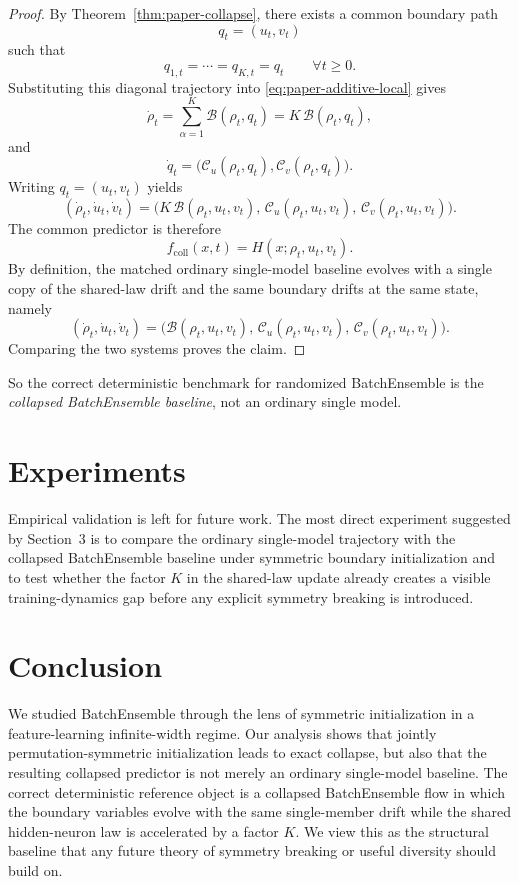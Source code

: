\documentclass{article}
\begin{document}
\begin{proof}
By Theorem~\ref{thm:paper-collapse}, there exists a common boundary path
\[
q_t=(u_t,v_t)
\]
such that
\[
q_{1,t}=\cdots=q_{K,t}=q_t
\qquad
\forall t\ge 0.
\]
Substituting this diagonal trajectory into \eqref{eq:paper-additive-local} gives
\[
\dot\rho_t
=
\sum_{\alpha=1}^K \mathcal B(\rho_t,q_t)
=
K\,\mathcal B(\rho_t,q_t),
\]
and
\[
\dot q_t
=
\bigl(\mathcal C_u(\rho_t,q_t),\mathcal C_v(\rho_t,q_t)\bigr).
\]
Writing $q_t=(u_t,v_t)$ yields
\[
(\dot\rho_t,\dot u_t,\dot v_t)
=
\bigl(
K\,\mathcal B(\rho_t,u_t,v_t),\,
\mathcal C_u(\rho_t,u_t,v_t),\,
\mathcal C_v(\rho_t,u_t,v_t)
\bigr).
\]
The common predictor is therefore
\[
f_{\mathrm{coll}}(x,t)=H(x;\rho_t,u_t,v_t).
\]
By definition, the matched ordinary single-model baseline evolves with a single copy of the shared-law drift and the same boundary drifts at the same state, namely
\[
(\dot\rho_t,\dot u_t,\dot v_t)
=
\bigl(
\mathcal B(\rho_t,u_t,v_t),\,
\mathcal C_u(\rho_t,u_t,v_t),\,
\mathcal C_v(\rho_t,u_t,v_t)
\bigr).
\]
Comparing the two systems proves the claim.
\end{proof}

So the correct deterministic benchmark for randomized BatchEnsemble is the \emph{collapsed BatchEnsemble baseline}, not an ordinary single model.

\section{Experiments}

Empirical validation is left for future work. The most direct experiment suggested by Section~3 is to compare the ordinary single-model trajectory with the collapsed BatchEnsemble baseline under symmetric boundary initialization and to test whether the factor $K$ in the shared-law update already creates a visible training-dynamics gap before any explicit symmetry breaking is introduced.

\section{Conclusion}

We studied BatchEnsemble through the lens of symmetric initialization in a feature-learning infinite-width regime. Our analysis shows that jointly permutation-symmetric initialization leads to exact collapse, but also that the resulting collapsed predictor is not merely an ordinary single-model baseline. The correct deterministic reference object is a collapsed BatchEnsemble flow in which the boundary variables evolve with the same single-member drift while the shared hidden-neuron law is accelerated by a factor $K$. We view this as the structural baseline that any future theory of symmetry breaking or useful diversity should build on.
\end{document}
